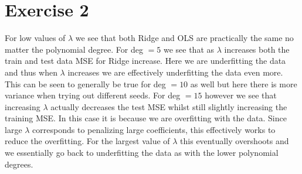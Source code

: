 \documentclass{article}
\begin{document}
	\section*{Exercise 2}
	For low values of $\lambda$ we see that both Ridge and OLS are practically the same no matter the polynomial degree. For deg $=5$ we see that as $\lambda$ increases both the train and test data MSE for Ridge increase. Here we are underfitting the data and thus when $\lambda$ increases we are effectively underfitting the data even more. This can be seen to generally be true for deg $=10$ as well but here there is more variance when trying out different seeds. For deg $=15$ however we see that increasing $\lambda$ actually decreases the test MSE whilst still slightly increasing the training MSE. In this case it is because we are overfitting with the data. Since large $\lambda$ corresponds to penalizing large coefficients, this effectively works to reduce the overfitting. For the largest value of $\lambda$ this eventually overshoots and we essentially go back to underfitting the data as with the lower polynomial degrees.
	
\end{document}
